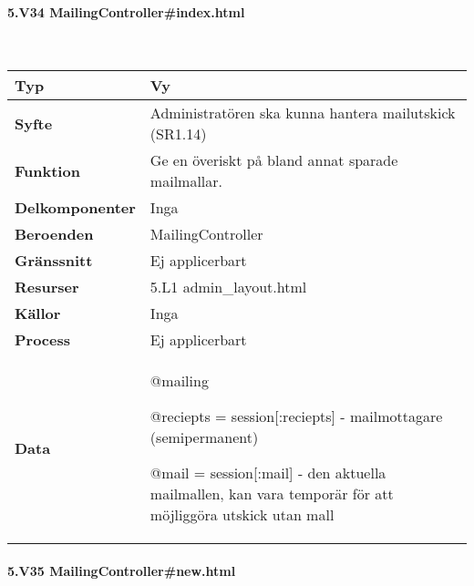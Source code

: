 \documentclass[a4paper, twoside, 11pt, titlepage]{article}
\begin{document}
			\paragraph{5.V34 MailingController\#index.html}\

			\begin {table} [ht] \begin{tabular} {  p{3.5cm} p{11.6cm} }
				\hline
				{\sffamily\textbf{Typ}} & {Vy} \\
				\hline
				{\sffamily\textbf{Syfte}} & {Administratören ska kunna hantera mailutskick (SR1.14)} \\
				\hline
				{\sffamily\textbf{Funktion}} & {Ge en överiskt på bland annat sparade mailmallar.} \\
				\hline
				{\sffamily\textbf{Delkomponenter}} & {Inga} \\
				\hline
				{\sffamily\textbf{Beroenden}} & {MailingController} \\
				\hline
				{\sffamily\textbf{Gränssnitt}} & {Ej applicerbart} \\
				\hline
				{\sffamily\textbf{Resurser}} & {5.L1 admin\_layout.html} \\
				\hline
				{\sffamily\textbf{Källor}} & {Inga} \\
				\hline
				{\sffamily\textbf{Process}} & {Ej applicerbart} \\
				\hline
				{\sffamily\textbf{Data}} & {@mailing

@reciepts = session[:reciepts] - mailmottagare (semipermanent)

@mail = session[:mail] - den aktuella mailmallen, kan vara temporär för att möjliggöra utskick utan mall} \\
				\hline
			\end{tabular} \end{table} \FloatBarrier


			\clearpage %
			\paragraph{5.V35 MailingController\#new.html}\
\end{document}
